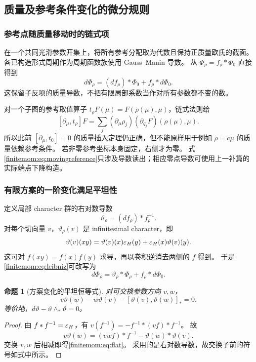 \documentclass[11pt,a4paper,oneside]{ctexart}
\theoremstyle{cnplain}
\newtheorem{proposition}[theorem]{命题}
\theoremstyle{definition}
\theoremstyle{remark}
\numberwithin{equation}{section}
\begin{document}
\subsection{质量及参考条件变化的微分规则}
\subsubsection{参考点随质量移动时的链式项}
在一个共同光滑参数开集上，将所有参考分配取为代数且保持正质量欧氏的截面。
各已构造形式周期作为周期函数族使用 Gauss--Manin 导数。
从 $\Phi_\rho=f_\rho*\Phi_0$ 直接得到
\begin{equation}\label{finitemom:eq:leibniz}
 d\Phi_\rho=(df_\rho)*\Phi_0+f_\rho*d\Phi_0.
\end{equation}
这保留子反项的质量导数，不把有限局部系数当作对所有参数都不变的数。

对一个子图的参考取值算子
$t_\rho F(\mu)=F(\rho(\mu),\mu)$，链式法则给
\begin{equation}\label{finitemom:eq:movingreference}
 [\partial_\mu,t_\rho]F
    =\sum_j(\partial_\mu\rho_j)
                           (\partial_{q_j}F)(\rho(\mu),\mu).
\end{equation}
所以此前 $[\partial_\mu,t_0]=0$ 的质量插入定理仍正确，但不能原样用于例如 $\rho=c\mu$ 的质量依赖参考条件。
若非零参考坐标本身固定，右侧才为零。
式\eqref{finitemom:eq:movingreference}只涉及导数读出；相应零点导数可使用上一补篇的实际端点下降构造。

\subsubsection{有限方案的一阶变化满足平坦性}
定义局部 character 群的右对数导数
\begin{equation}\label{finitemom:eq:connection}
 \vartheta_\rho=(df_\rho)*f_\rho^{-1}.
\end{equation}
对每个切向量 $v$，$\vartheta_\rho(v)$ 是 infinitesimal character，即
\begin{equation}\label{finitemom:eq:infchar}
 \vartheta(v)(xy)=\vartheta(v)(x)\varepsilon_H(y)
                              +\varepsilon_H(x)\vartheta(v)(y).
\end{equation}
这可对 $f(xy)=f(x)f(y)$ 求导，再以卷积逆消去两侧的 $f$ 得到。
于是\eqref{finitemom:eq:leibniz}可改写为
\begin{equation}\label{finitemom:eq:gauge}
 d\Phi_\rho=\vartheta_\rho*\Phi_\rho+f_\rho*d\Phi_0.
\end{equation}

\begin{proposition}[方案变化的平坦恒等式]\label{finitemom:prop:flat}
对可交换参数方向 $v,w$，
\begin{equation}\label{finitemom:eq:flat}
 v\vartheta(w)-w\vartheta(v)
                   -[\vartheta(v),\vartheta(w)]_*=0.
\end{equation}
等价地，$d\vartheta-\vartheta\wedge_*\vartheta=0$。
\end{proposition}
\begin{proof}
由 $f*f^{-1}=\varepsilon_H$，有
$v(f^{-1})=-f^{-1}*(vf)*f^{-1}$。
故
\[
 v\vartheta(w)=(vwf)*f^{-1}-\vartheta(w)*\vartheta(v).
\]
交换 $v,w$ 后相减即得\eqref{finitemom:eq:flat}。
采用的是右对数导数，故交换子前的符号如式中所示。
\end{proof}
\end{document}
